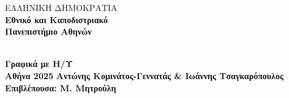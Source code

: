 \begin{titlepage}
		\begin{center}
			\begin{minipage}{0.15\textwidth}
			\end{minipage}
			\begin{minipage}{0.40\textwidth}
				\centering
				ΕΛΛΗΝΙΚΗ ΔΗΜΟΚΡΑΤΙΑ\\
				\large{\textbf{Εθνικό και Καποδιστριακό\\Πανεπιστήμιο Αθηνών}}\\[2mm]
			\end{minipage}
			\hRule
			\vspace{10pt}
			\\
			\Large{\textbf{Γραφικά με Η/Υ}} \\[4mm]
			\large{\textbf{Αθήνα 2025}}
			\vfill
			\normalsize{\textbf{Αντώνης Κομινάτος-Γεννατάς \&  Ιωάννης Τσαγκαρόπουλος }}\\[4mm]
			\small{\textbf{Επιβλέπουσα: Μ. Μητρούλη}}
		\end{center}
	\end{titlepage}